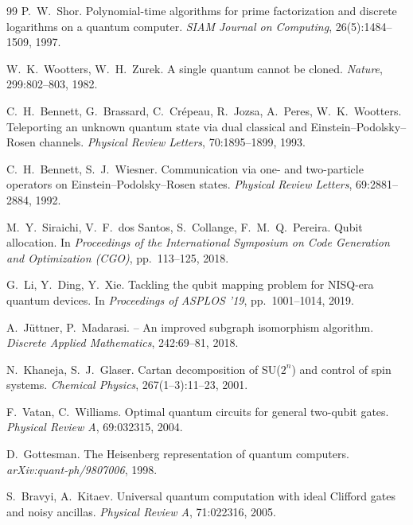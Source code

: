 \begin{thebibliography}{99}
P.~W.~Shor.
\newblock Polynomial-time algorithms for prime factorization and discrete logarithms on a quantum
computer.
\newblock \emph{SIAM Journal on Computing}, 26(5):1484--1509, 1997.

W.~K.~Wootters, W.~H.~Zurek.
\newblock A single quantum cannot be cloned.
\newblock \emph{Nature}, 299:802--803, 1982.

C.~H.~Bennett, G.~Brassard, C.~Crépeau, R.~Jozsa, A.~Peres, W.~K.~Wootters.
\newblock Teleporting an unknown quantum state via dual classical and {Einstein--Podolsky--Rosen}
channels.
\newblock \emph{Physical Review Letters}, 70:1895--1899, 1993.

C.~H.~Bennett, S.~J.~Wiesner.
\newblock Communication via one- and two-particle operators on {Einstein--Podolsky--Rosen} states.
\newblock \emph{Physical Review Letters}, 69:2881--2884, 1992.

M.~Y.~Siraichi, V.~F.~dos Santos, S.~Collange, F.~M.~Q.~Pereira.
\newblock Qubit allocation.
\newblock In \emph{Proceedings of the International Symposium on Code Generation and Optimization
(CGO)}, pp.~113--125, 2018.

G.~Li, Y.~Ding, Y.~Xie.
\newblock Tackling the qubit mapping problem for {NISQ}-era quantum devices.
\newblock In \emph{Proceedings of ASPLOS '19}, pp.~1001--1014, 2019.

A.~Jüttner, P.~Madarasi.
 -- An improved subgraph isomorphism algorithm.
\newblock \emph{Discrete Applied Mathematics}, 242:69--81, 2018.

N.~Khaneja, S.~J.~Glaser.
\newblock Cartan decomposition of {SU($2^n$)} and control of spin systems.
\newblock \emph{Chemical Physics}, 267(1--3):11--23, 2001.

F.~Vatan, C.~Williams.
\newblock Optimal quantum circuits for general two-qubit gates.
\newblock \emph{Physical Review A}, 69:032315, 2004.

D.~Gottesman.
\newblock The {Heisenberg} representation of quantum computers.
\newblock \emph{arXiv:quant-ph/9807006}, 1998.

S.~Bravyi, A.~Kitaev.
\newblock Universal quantum computation with ideal {Clifford} gates and noisy ancillas.
\newblock \emph{Physical Review A}, 71:022316, 2005.


\end{thebibliography}
